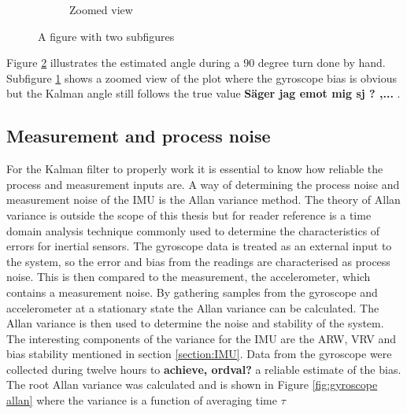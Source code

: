\documentclass[a4paper,11pt]{kth-mag}
\begin{document}
\begin{figure}
\begin{subfigure}{.5\textwidth}
  \caption{Zoomed view}
  \label{Fig: Kalmanturnzoom}
\end{subfigure}
\caption{A figure with two subfigures}
\label{Fig: Kalmanturnfull}
\end{figure}

Figure \ref{Fig: Kalmanturnfull} illustrates the estimated angle during a 90 degree turn done by hand. Subfigure \ref{Fig: Kalmanturnzoom} shows a zoomed view of the plot where the gyroscope bias is obvious but the Kalman angle still follows the true value \textbf{Säger jag emot mig sj ? ,...} .



\subsection{Measurement and process noise} \label{chapter:Allan Variance}
For the Kalman filter to properly work it is essential to know how reliable the process and measurement inputs are.  A way of determining the process noise and measurement noise of the IMU is the Allan variance method. The theory of Allan variance is outside the scope of this thesis but for reader reference is a time domain analysis technique commonly used to determine the characteristics of errors for inertial sensors\cite{Allancalibration}.
The gyroscope data is treated as an external input to the system, so the error and bias from the readings are characterised as process noise. This is then compared to the measurement, the accelerometer, which contains a measurement noise.
By gathering samples from the gyroscope and accelerometer at a stationary state the Allan variance can be calculated. The Allan variance is then used to determine the noise and stability of the system. The interesting components of the variance for the IMU are the ARW, VRV and bias stability mentioned in section \ref{section:IMU}.
Data from the gyroscope were collected during twelve hours to \textbf{achieve, ordval?} a reliable estimate of the bias. 
The root Allan variance was calculated and is shown in Figure \ref{fig:gyroscope allan} where the variance is a function of averaging time $\tau$
\end{document}

